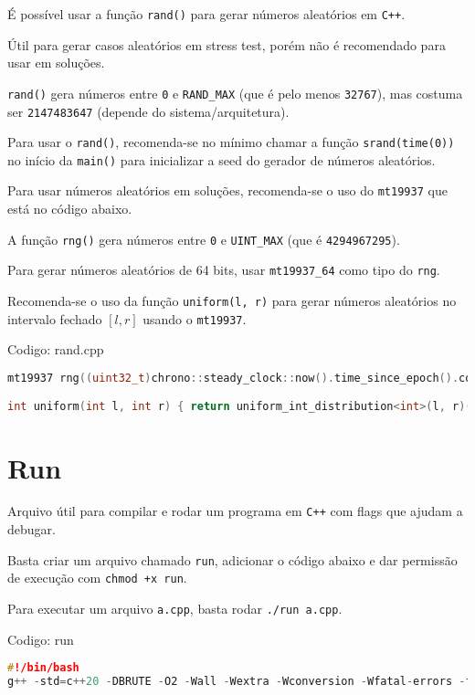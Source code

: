 \documentclass[10pt, a4paper, oneside]{book}
\begin{document}
É possível usar a função \texttt{rand()} para gerar números aleatórios em \texttt{C++}.

Útil para gerar casos aleatórios em stress test, porém não é recomendado para usar em soluções.

\texttt{rand()} gera números entre \texttt{0} e \texttt{RAND\_MAX} (que é pelo menos \texttt{32767}), mas costuma ser \texttt{2147483647} (depende do sistema/arquitetura).

Para usar o \texttt{rand()}, recomenda-se no mínimo chamar a função \texttt{srand(time(0))} no início da \texttt{main()} para inicializar a seed do gerador de números aleatórios.



Para usar números aleatórios em soluções, recomenda-se o uso do \texttt{mt19937} que está no código abaixo.

A função \texttt{rng()} gera números entre \texttt{0} e \texttt{UINT\_MAX} (que é \texttt{4294967295}).

Para gerar números aleatórios de 64 bits, usar \texttt{mt19937\_64} como tipo do \texttt{rng}.

Recomenda-se o uso da função \texttt{uniform(l, r)} para gerar números aleatórios no intervalo fechado $[l, r]$ usando o \texttt{mt19937}.

\hfill

Codigo: rand.cpp

\begin{lstlisting}[language=C++]
mt19937 rng((uint32_t)chrono::steady_clock::now().time_since_epoch().count());

int uniform(int l, int r) { return uniform_int_distribution<int>(l, r)(rng); }
\end{lstlisting}
\hfill

\section{Run}


Arquivo útil para compilar e rodar um programa em \texttt{C++} com flags que ajudam a debugar.

Basta criar um arquivo chamado \texttt{run}, adicionar o código abaixo e dar permissão de execução com \texttt{chmod +x run}.

Para executar um arquivo \texttt{a.cpp}, basta rodar \texttt{./run a.cpp}.

\hfill

Codigo: run

\begin{lstlisting}[language=C++]
#!/bin/bash
g++ -std=c++20 -DBRUTE -O2 -Wall -Wextra -Wconversion -Wfatal-errors -fsanitize=address,undefined $1 && ./a.out\end{lstlisting}
\hfill
\end{document}
